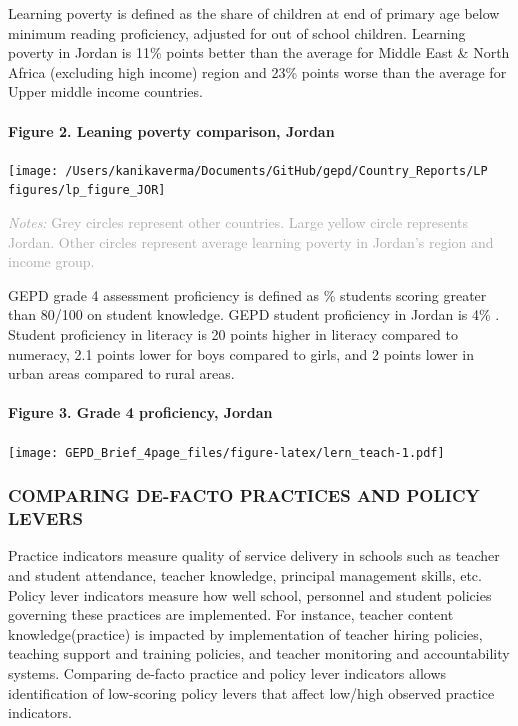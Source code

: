 \documentclass[twocolumn]{article}
\let\oldparagraph\paragraph
\renewcommand{\paragraph}[1]{\oldparagraph{#1}\mbox{}}
\begin{document}
Learning poverty is defined as the share of children at end of primary
age below minimum reading proficiency, adjusted for out of school
children. Learning poverty in Jordan is 11\% points better than the
average for Middle East \& North Africa (excluding high income) region
and 23\% points worse than the average for Upper middle income
countries.

\hypertarget{figure-2.-leaning-poverty-comparison-jordan}{%
\paragraph{Figure 2. Leaning poverty comparison,
Jordan}\label{figure-2.-leaning-poverty-comparison-jordan}}

\texttt{[image: /Users/kanikaverma/Documents/GitHub/gepd/Country\_Reports/LP figures/lp\_figure\_JOR]}

{\scriptsize
    \textcolor{darkgray}{\textit{Notes:} Grey circles represent other countries. Large yellow circle represents Jordan. Other circles represent average learning poverty in Jordan's region and income group.}
  }

GEPD grade 4 assessment proficiency is defined as \% students scoring
greater than 80/100 on student knowledge. GEPD student proficiency in
Jordan is 4\% . \vfill\null Student proficiency in literacy is 20 points
higher in literacy compared to numeracy, 2.1 points lower for boys
compared to girls, and 2 points lower in urban areas compared to rural
areas.

\hypertarget{figure-3.-grade-4-proficiency-jordan}{%
\paragraph{Figure 3. Grade 4 proficiency,
Jordan}\label{figure-3.-grade-4-proficiency-jordan}}

\texttt{[image: GEPD\_Brief\_4page\_files/figure-latex/lern\_teach-1.pdf]}

\hypertarget{comparing-de-facto-practices-and-policy-levers}{%
\subsubsection{\texorpdfstring{\textbf{COMPARING DE-FACTO PRACTICES AND
POLICY
LEVERS}}{COMPARING DE-FACTO PRACTICES AND POLICY LEVERS}}\label{comparing-de-facto-practices-and-policy-levers}}

Practice indicators measure quality of service delivery in schools such
as teacher and student attendance, teacher knowledge, principal
management skills, etc. Policy lever indicators measure how well school,
personnel and student policies governing these practices are
implemented. For instance, teacher content knowledge(practice) is
impacted by implementation of teacher hiring policies, teaching support
and training policies, and teacher monitoring and accountability
systems. Comparing de-facto practice and policy lever indicators allows
identification of low-scoring policy levers that affect low/high
observed practice indicators.
\end{document}
